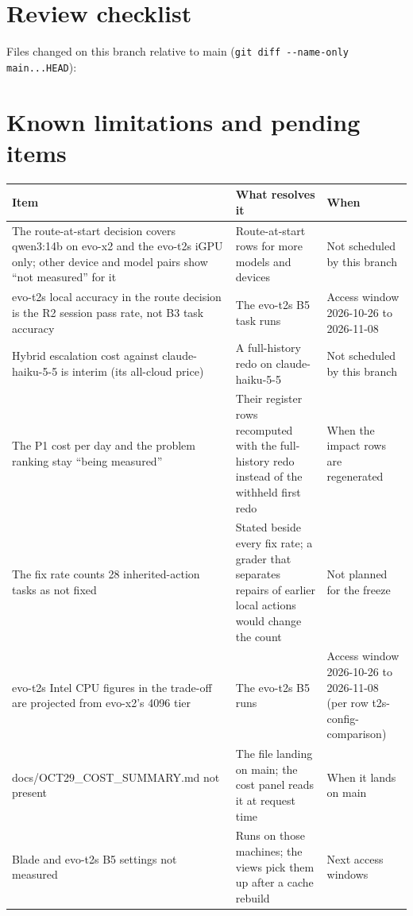 \documentclass[11pt]{article}
\begin{document}
\section{Review checklist}

\noindent Files changed on this branch relative to main (\texttt{git diff -{}-name-only main...HEAD}):


\section{Known limitations and pending items}
\begin{longtable}{>{\raggedright\arraybackslash}p{}>{\raggedright\arraybackslash}p{}>{\raggedright\arraybackslash}p{}}
\toprule
\textbf{Item} & \textbf{What resolves it} & \textbf{When}\\\midrule\endhead
The route-at-start decision covers qwen3:14b on evo-x2 and the evo-t2s iGPU only; other device and model pairs show
``not measured'' for it & Route-at-start rows for more models and devices & Not scheduled by this branch\\
evo-t2s local accuracy in the route decision is the R2 session pass rate, not B3 task accuracy & The evo-t2s B5 task
runs & Access window 2026-10-26 to 2026-11-08\\
Hybrid escalation cost against claude-haiku-5-5 is interim (its all-cloud price) & A full-history redo on
claude-haiku-5-5 & Not scheduled by this branch\\
The P1 cost per day and the problem ranking stay ``being measured'' & Their register rows recomputed with the
full-history redo instead of the withheld first redo & When the impact rows are regenerated\\
The fix rate counts 28 inherited-action tasks as not fixed & Stated beside every fix rate; a grader that separates
repairs of earlier local actions would change the count & Not planned for the freeze\\
evo-t2s Intel CPU figures in the trade-off are projected from evo-x2's 4096 tier & The evo-t2s B5 runs & Access
window 2026-10-26 to 2026-11-08 (per row t2s-config-comparison)\\
docs/OCT29\_COST\_\allowbreak SUMMARY.md not present & The file landing on main; the cost panel reads it at request time &
When it lands on main\\
Blade and evo-t2s B5 settings not measured & Runs on those machines; the views pick them up after a cache rebuild &
Next access windows\\

\end{longtable}
\end{document}
